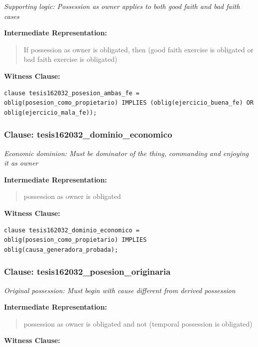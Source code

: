 \documentclass[11pt,a4paper]{article}
\begin{document}
\textit{Supporting logic: Possession as owner applies to both good faith and bad faith cases}

\textbf{Intermediate Representation:}

\begin{quote}
If possession as owner is obligated, then (good faith exercise is obligated or bad faith exercise is obligated)
\end{quote}

\textbf{Witness Clause:}

\begin{lstlisting}[style=witnessstyle, language=Witness]
clause tesis162032_posesion_ambas_fe = oblig(posesion_como_propietario) IMPLIES (oblig(ejercicio_buena_fe) OR oblig(ejercicio_mala_fe));
\end{lstlisting}

\subsubsection{Clause: tesis162032\_dominio\_economico}

\textit{Economic dominion: Must be dominator of the thing, commanding and enjoying it as owner}

\textbf{Intermediate Representation:}

\begin{quote}
possession as owner is obligated
\end{quote}

\textbf{Witness Clause:}

\begin{lstlisting}[style=witnessstyle, language=Witness]
clause tesis162032_dominio_economico = oblig(posesion_como_propietario) IMPLIES oblig(causa_generadora_probada);
\end{lstlisting}

\subsubsection{Clause: tesis162032\_posesion\_originaria}

\textit{Original possession: Must begin with cause different from derived possession}

\textbf{Intermediate Representation:}

\begin{quote}
possession as owner is obligated and not (temporal possession is obligated)
\end{quote}

\textbf{Witness Clause:}
\end{document}
